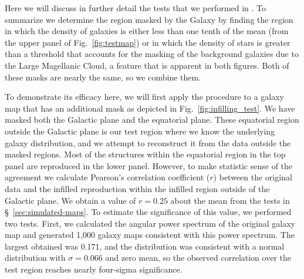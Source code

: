 \documentclass[useAMS,usenatbib]{mn2e}
\begin{document}
Here we will discuss in further detail the tests that we performed in
\citet{2016arXiv160207710A}.  To summarize we determine the region
masked by the Galaxy by finding the region in which the density of
galaxies is either less than one tenth of the mean (from the upper
panel of Fig.~\ref{fig:testmap}) or in which the density of stars
\citep[from Fig.~2][]{2016arXiv160207710A} is greater than a threshold
that accounts for the masking of the background galaxies due to the
Large Magellanic Cloud, a feature that is apparent in both figures.
Both of these masks are nearly the same, so we combine them.

To demonstrate its efficacy here, we will first apply the procedure to
a galaxy map that has an additional mask as depicted in
Fig.~\ref{fig:infilling_test}.  We have masked both the Galactic plane
and the equatorial plane.  These equatorial region outside the
Galactic plane is our test region where we know the underlying galaxy
distribution, and we attempt to reconstruct it from the data outside
the masked regions.  Most of the structures within the equatorial
region in the top panel are reproduced in the lower panel.  However,
to make statistic sense of the agreement we calculate Pearson's
correlation coefficient ($r$) between the original data and the
infilled reproduction within the infilled region outside of the
Galactic plane.  We obtain a value of $r=0.25$ about the mean from the
tests in \S~\ref{sec:simulated-maps}.  To estimate the significance of
this value, we performed two tests.  First, we calculated the angular
power spectrum of the original galaxy map and generated 1,000 galaxy
maps consistent with this power spectrum.  The largest obtained was
0.171, and the distribution was consistent with a normal distribution
with $\sigma=0.066$ and zero mean, so the observed correlation over
the test region reaches nearly four-sigma significance.
\end{document}

